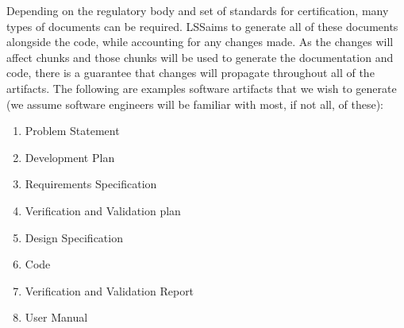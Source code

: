 \documentclass{sig-alternate-05-2015}
\newcommand{\lss}{LSS}
\begin{document}
Depending on the regulatory body and set of standards for certification, many
types of documents can be required. \lss aims to generate all of these documents
alongside the code, while accounting for any changes made. As the changes will
affect chunks and those chunks will be used to generate the documentation and
code, there is a guarantee that changes will propagate throughout all of the
artifacts. The following are examples software artifacts that we wish to
generate (we assume software engineers will be familiar with most, if not all,
of these):

\begin{enumerate}
\item Problem Statement
\item Development Plan
\item Requirements Specification
\item Verification and Validation plan
\item Design Specification
\item Code
\item Verification and Validation Report
\item User Manual
\end{enumerate}
\end{document}
